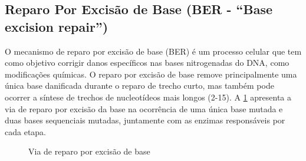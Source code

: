 \documentclass[11pt,a4paper]{article}
\begin{document}
\subsection*{Reparo Por Excisão de Base (BER - ``Base excision repair'')}

	O mecanismo de reparo por excisão de base (BER) é um processo celular que tem como objetivo corrigir danos específicos nas bases nitrogenadas do DNA, como modificações químicas. O reparo por excisão de base remove principalmente uma única base danificada durante o reparo de trecho curto, mas também pode ocorrer a síntese de trechos de nucleotídeos mais longos (2-15). A \ref{fig:excisaodeBase} apresenta a via de reparo por excisão da base na ocorrência de uma única base mutada e duas bases sequenciais mutadas, juntamente com as enzimas responsáveis por cada etapa.


	\begin{figure}[h]
		\centering
		\caption{Via de reparo por excisão de base}
		\label{fig:excisaodeBase}
	\end{figure}
\end{document}
